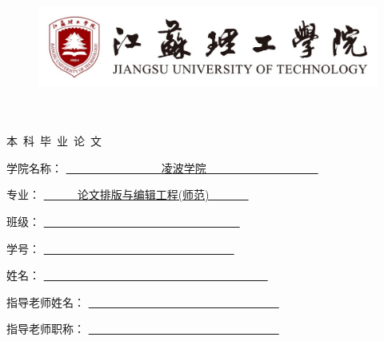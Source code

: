 \begin{figure}[t]
	\parbox[b]{2cm}{
		\includegraphics[width=\textwidth]{logo}
	}
\end{figure}

\begin{center}
	\quad \\
	\quad \\
	\heiti {} 本\ 科\ 毕\ 业\ 论\ 文
	\vskip 3cm

\end{center}
	\vskip 2cm


\begin{center}
	\songti 
	\fontsize{14}{13}\selectfont 
	学院名称：
	\underline{~~~~~~~~~~~~~~~~~凌波学院~~~~~~~~~~~~~~~~~~~~}
		
	专\qquad 业：
	\underline{~~~~~~论文排版与编辑工程(师范)~~~~~~~}
		
	班\qquad 级：
	\underline{~~~~~~~~~~~~~~~~\class~~~~~~~~~~~~~~~~~~~}
		
	学\qquad 号：
	\underline{~~~~~~~~~~~~~~~\studentnumber~~~~~~~~~~~~~~~~~~~}
		
	姓\qquad 名：
	\underline{~~~~~~~~~~~~~~~~~~~\name~~~~~~~~~~~~~~~~~~~~~}
		
	指导老师姓名：
	\underline{~~~~~~~~~~~~~\adviser~~~~~~~~~~~~~~~~~~~~~}
		
	指导老师职称：
	\underline{~~~~~~~~~~~~~\professionaltitle~~~~~~~~~~~~~~~~~~~~~}
		
	\vskip 1.5cm
		
	\cnyear
\end{center} 